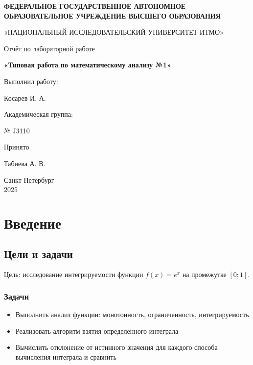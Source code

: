 \documentclass[a4paper, 12pt]{report}
\begin{document}
\begin{titlepage}
    \centering
    {\large \textbf{ФЕДЕРАЛЬНОЕ ГОСУДАРСТВЕННОЕ АВТОНОМНОЕ ОБРАЗОВАТЕЛЬНОЕ УЧРЕЖДЕНИЕ ВЫСШЕГО ОБРАЗОВАНИЯ} \par}
    {\large «НАЦИОНАЛЬНЫЙ ИССЛЕДОВАТЕЛЬСКИЙ УНИВЕРСИТЕТ ИТМО» \par}
    \vspace{9cm}
    {\large {Отчёт по лабораторной работе} \par}
    {\large \textbf{«Типовая работа по математическому анализу №1»} \par}

    \vfill 
    \begin{flushright}
        {\large Выполнил работу: \par}
        {\large Косарев И. А. \par}
        {\large Академическая группа: \par}
        {\large № J3110 \par}
        \vspace{1cm}
        {\large Принято \par}
        {\large Табиева А. В. \par}
    \end{flushright}
    \vspace{1cm}
    {\large Санкт-Петербург \\ 2025}
\end{titlepage}

\tableofcontents
\newpage

\chapter*{Введение}
\setcounter{chapter}{1}
\setcounter{section}{0}

\section{Цели и задачи}
Цель: исследование интегрируемости функции $f(x) = e^{x}$ на промежутке $[0;1]$.

\subsection{Задачи}

\begin{itemize}
    \item Выполнить анализ функции: монотонность, ограниченность, интегрируемость
    \item Реализовать алгоритм взятия определенного интеграла
    \item Вычислить отклонение от истинного значения для каждого способа вычисления интеграла и сравнить
\end{itemize}
\end{document}
